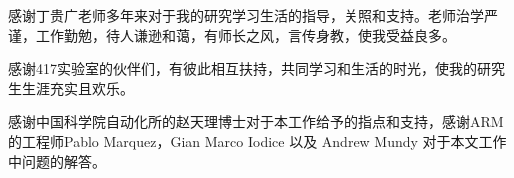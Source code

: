 
\begin{acknowledgements}
	感谢丁贵广老师多年来对于我的研究学习生活的指导，关照和支持。老师治学严谨，工作勤勉，待人谦逊和蔼，有师长之风，言传身教，使我受益良多。

	感谢417实验室的伙伴们，有彼此相互扶持，共同学习和生活的时光，使我的研究生生涯充实且欢乐。

	感谢中国科学院自动化所的赵天理博士对于本工作给予的指点和支持，感谢ARM 的工程师Pablo Marquez，Gian Marco Iodice 以及 Andrew Mundy 对于本文工作中问题的解答。
\end{acknowledgements}
